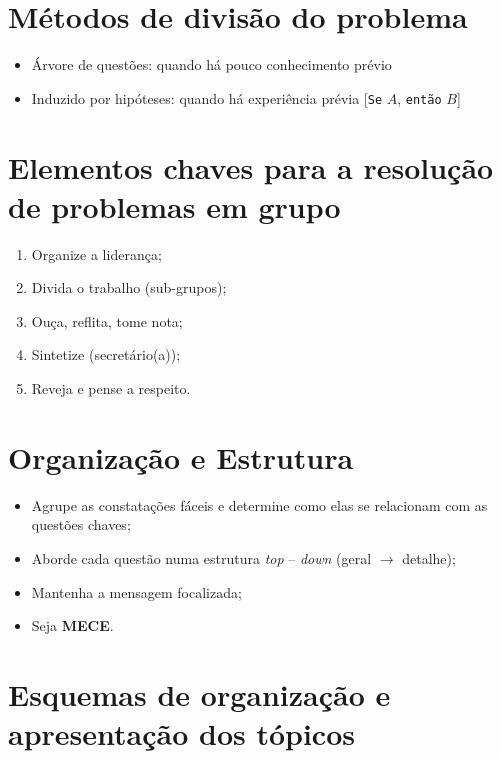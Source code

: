 \section{Métodos de divisão do problema}

\begin{itemize}
	\item  Árvore de questões: quando há pouco conhecimento prévio
	\item  Induzido por hipóteses: quando há experiência prévia [\texttt{Se} $A$, \texttt{então} $B$]
\end{itemize}


\section{Elementos chaves para a resolução de problemas em grupo}

\begin{enumerate}
	\item  Organize a liderança;
	\item  Divida o trabalho (sub-grupos);
	\item  Ouça, reflita, tome nota;
	\item  Sintetize (secretário(a));
	\item  Reveja e pense a respeito.
\end{enumerate}

\section{Organização e Estrutura}

\begin{itemize}
	\item  Agrupe as constatações fáceis e determine como elas se relacionam com as questões chaves;
	\item  Aborde cada questão numa estrutura \emph{top} -- \emph{down} (geral $\to$ detalhe);
	\item  Mantenha a mensagem focalizada;
	\item  Seja \textbf{MECE}.
\end{itemize}

\section{Esquemas de organização e apresentação dos tópicos}

